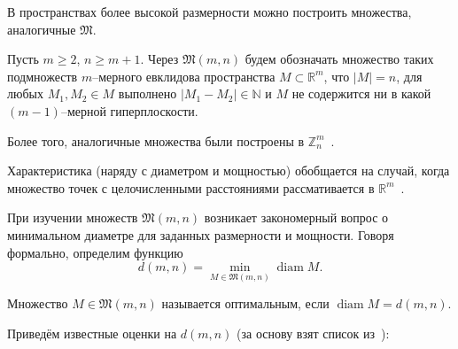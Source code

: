 В пространствах более высокой размерности можно построить множества, аналогичные $\mathfrak{M}$.

\begin{definition}
	Пусть $m \geq 2$, $n \geq m + 1$.
	Через $\mathfrak{M}(m,n)$ будем обозначать множество таких подмножеств $m$--мерного евклидова пространства
	$M\subset\mathbb{R}^m$, что $|M| = n$, для любых $M_1,M_2 \in M$ выполнено $|M_1 - M_2| \in\mathbb{N}$
	и $M$ не содержится ни в какой $(m-1)$--мерной гиперплоскости.
\end{definition}

Более того, аналогичные множества были построены в $\mathbb{Z}^m_n$~\cite{Kohnert2006IntegralPS}.

Характеристика (наряду с диаметром и мощностью) обобщается на случай, когда множество точек с целочисленными расстояниями
рассмативается в $\mathbb{R}^m$~\cite{kurz2005characteristic}.

При изучении множеств $\mathfrak{M}(m,n)$ возникает закономерный вопрос
о минимальном диаметре для заданных размерности и мощности.
Говоря формально, определим функцию
\begin{equation*}
	d(m,n) = \min_{M\in\mathfrak{M}(m,n)} \operatorname{diam} M
	.
\end{equation*}

\begin{definition}
	Множество $M\in\mathfrak{M}(m,n)$ называется оптимальным,
	если $\operatorname{diam} M = d(m,n)$.
\end{definition}

Приведём известные оценки на $d(m,n)$
(за основу взят список из~\cite{kurz2008bounds}):


